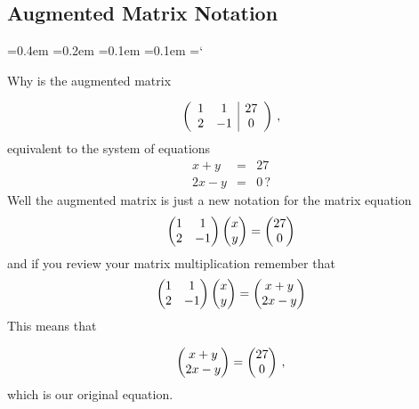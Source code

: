 \subsection*{Augmented Matrix Notation}

{\ttfamily
{}\font=0.4em
\font=0.2em
\font=0.1em
\font=0.1em
\hyphenchar\font=`\-


\hypertarget{script_gaussian_elimination_more}{Why is the augmented  matrix} 
$$ \left( \begin{array}{cc | c}
1 & 1 & 27 \\
2 & -1 & 0  
\end{array} \right)\, ,
$$
equivalent to the system of equations
\begin{eqnarray*}
 x+y &=& 27\\
 2x - y &=& 0\, ?
\end{eqnarray*}
Well the augmented matrix is just a new notation for the matrix equation
\begin{equation*}
    \begin{pmatrix}
      1             &1  \\
      2             &-1
    \end{pmatrix}
  \begin{pmatrix} x \\ y \end{pmatrix}
  =
  \begin{pmatrix} 27 \\ 0 \end{pmatrix}
\end{equation*}
and if you review your matrix multiplication remember that 
\begin{equation*}
    \begin{pmatrix}
      1             &1  \\
      2             &-1
    \end{pmatrix}
  \begin{pmatrix} x \\ y \end{pmatrix}
  =
  \begin{pmatrix} x+ y \\ 2x - y \end{pmatrix}
\end{equation*}
This means that

\begin{equation*}
  \begin{pmatrix} x+ y \\ 2x - y \end{pmatrix}
  =
  \begin{pmatrix} 27 \\ 0 \end{pmatrix}\, ,
\end{equation*}
which is our original equation.

}

